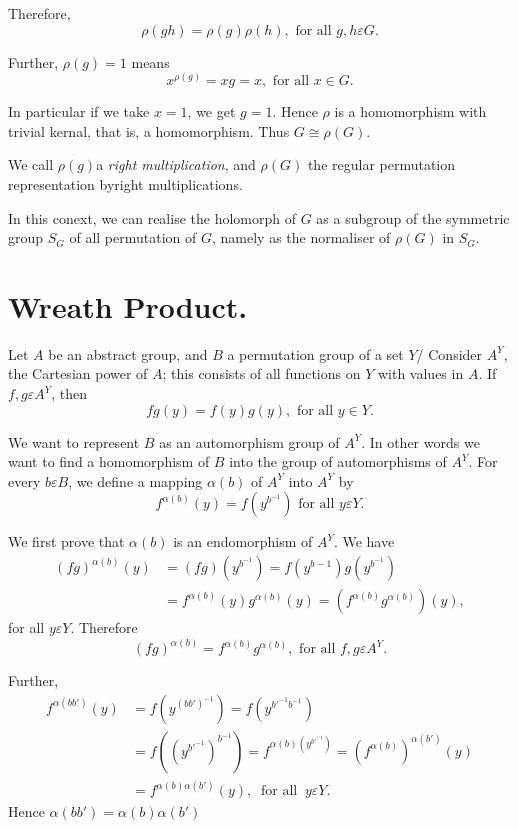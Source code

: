 Therefore,
 $$
 \rho (gh) =\rho (g) \rho(h), \text{ for all } g,h \varepsilon G.
 $$
 
 Further, $\rho(g)=1$ means
 $$
 x^{\rho(g)}=xg=x, \text{  for all  } x \in G.
 $$
 
 In particular if we take $x=1$, we get $g =1$. Hence $\rho$ is a
 homomorphism with trivial  kernal, that is, a homomorphism. Thus $G
 \cong \rho(G)$. 
 
 We call $\rho(g)$a \textit{right multiplication}, and $\rho (G)$ the
 regular permutation representation byright multiplications. 
 
In this conext, we can realise the holomorph of $G$ as a subgroup of
the symmetric group $S_G$ of all permutation of $G$, namely as the
normaliser of $\rho(G)$ in $S_G$. 
 
\section{Wreath Product.}  %
 
Let $A$ be an abstract group, and $B$ a permutation group of a set
$Y$/ Consider $A^Y$, the Cartesian power of $A$; this consists of all
functions  on $Y$ with values in $A$. If $f,g \varepsilon A^Y$, then  
$$
fg(y) = f(y) g(y), \text{ for all } y \in Y.
$$
 
We want to represent $B$ as an automorphism group of $A^Y$. In other
words we want to find a homomorphism of $B$ into the group of
automorphisms of $A^Y$. For every $b \varepsilon B$, we define a
mapping $\alpha (b)$ of $A^Y$ into $A^Y$ by  
$$
f^{\alpha (b)} (y) = f(y^{b^{-1}}) \text{ for all } y \varepsilon Y.
$$
 
We first prove that $\alpha (b)$ is an endomorphism of $A^Y$. We have 
\begin{align*}
  (fg)^{\alpha (b)} (y) & = (fg)(y^{b^{-1}}) = f(y^{b-1}) g (y^{b^{-1}}) \\
  & =f^{\alpha (b)} (y) g^{\alpha (b)} (y) = (f^{\alpha (b)}g^{\alpha (b)}) (y), 
\end{align*}
for all $y \varepsilon Y$. Therefore 
$$
(fg)^{\alpha (b)}= f^{\alpha (b)} g^{\alpha (b)}, \text{ for all } f,g
\varepsilon A^Y. 
$$

Further,
\begin{align*}
  f^{\alpha (bb')}(y) & =f(y^{(bb')^{-1}}) = f(y^{b'^{-1} b^{-1}}) \\
  &= f((y^{b'^{-1}})^{b^{-1}}) = f^{\alpha (b) (y^{b'^{-1}})}  =
  (f^{\alpha (b)})^{\alpha (b')}(y) \\ 
  &= f^{\alpha (b) \alpha (b')}(y),~ \text{ for all } ~y  \varepsilon Y.
\end{align*}
Hence \qquad $ \alpha (bb') = \alpha (b) \alpha (b')$

